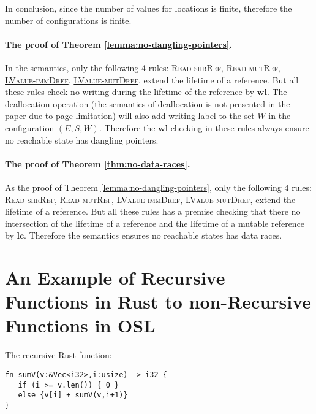 \documentclass[runningheads]{llncs}
\def\refrule#1{\hyperref[#1]{\textsc{#1}}}
\newcommand{\terminal}[1]{\textbf{#1}}
\begin{document}
In conclusion, since the number of values for locations is finite, therefore the number of configurations is finite.




\paragraph{The proof of Theorem \ref{lemma:no-dangling-pointers}.}
In the semantics, only the following 4 rules: \refrule{Read-shrRef}, \refrule{Read-mutRef}, \refrule{LValue-immDref},
\refrule{LValue-mutDref}, extend the lifetime of a reference.
But all these rules check no writing during the lifetime of the reference by $\terminal{wl}$.
The deallocation operation (the semantics of deallocation is not presented in the paper due to page limitation) will also add writing label to the set $W$ in the configuration $(E,S,W)$. Therefore the $\terminal{wl}$ checking in these rules always ensure no reachable state has
 dangling pointers.


\paragraph{The proof of Theorem \ref{thm:no-data-races}.}
As the proof of Theorem \ref{lemma:no-dangling-pointers}, only the following 4 rules: \refrule{Read-shrRef}, \refrule{Read-mutRef}, \refrule{LValue-immDref},
\refrule{LValue-mutDref}, extend the lifetime of a reference.
But all these rules has a premise checking that there no intersection of the lifetime of a reference and the lifetime of a mutable reference by $\terminal{lc}$.
Therefore the semantics ensures no reachable states has data races.

\section{An Example of Recursive Functions in Rust to non-Recursive Functions in OSL}
\label{appendix:recursiveexample}

The recursive Rust function:
\renewcommand{\ttdefault}{pcr}
\begin{lstlisting}
fn sumV(v:&Vec<i32>,i:usize) -> i32 {
   if (i >= v.len()) { 0 }
   else {v[i] + sumV(v,i+1)}
}
\end{lstlisting}

\end{document}
